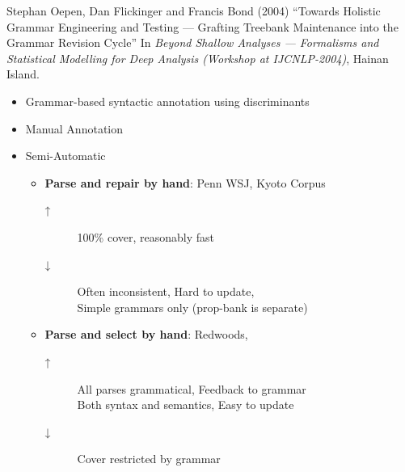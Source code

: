 \documentclass[a4paper,landscape,headrule,footrule,dvips]{foils}
\begin{document}
\begin{CJK}{UTF8}{min}
Stephan Oepen, Dan Flickinger and Francis Bond (2004)
     ``Towards Holistic Grammar Engineering and Testing --- Grafting Treebank Maintenance into the Grammar Revision Cycle'' In \textit{Beyond Shallow Analyses --- Formalisms and Statistical Modelling for Deep Analysis (Workshop at IJCNLP-2004)}, Hainan Island. 



\begin{itemize}
\item Grammar-based syntactic annotation using discriminants
\end{itemize}


\begin{itemize}
\item Manual Annotation
\item Semi-Automatic 
  \begin{itemize}
  \item \textbf{Parse and repair by hand}: Penn WSJ, Kyoto Corpus
    \begin{description}
    \item [↑] 100\% cover, reasonably fast
    \item [↓] Often inconsistent, Hard to update,   \\
      Simple grammars only (prop-bank is separate)
    \end{description}
  \item \textbf{Parse and select by hand}: Redwoods, 
    \begin{description}
    \item [↑] All parses grammatical, Feedback to grammar
      \\ Both syntax and semantics, Easy to update
    \item [↓] Cover restricted by grammar
    \end{description}
  \end{itemize}
\end{itemize}


\end{CJK}
\end{document}
